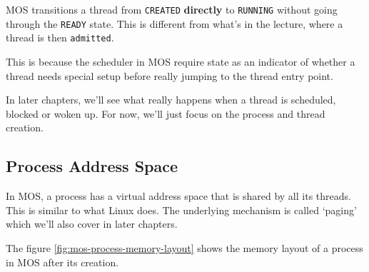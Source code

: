 \begin{note}
    \item MOS transitions a thread from \texttt{CREATED} \textbf{directly} to
    \texttt{RUNNING} without going through the \texttt{READY} state. This is different
    from what's in the lecture, where a thread is then \texttt{admitted}.

    This is because the scheduler in MOS require state as an indicator of whether a thread
    needs special setup before really jumping to the thread entry point.
\end{note}

In later chapters, we'll see what really happens when a thread is scheduled, blocked
or woken up. For now, we'll just focus on the process and thread creation.

\subsection{Process Address Space}

In MOS, a process has a virtual address space that is shared by all its threads. This is
similar to what Linux does. The underlying mechanism is called `paging' which we'll
also cover in later chapters.

The figure \ref{fig:mos-process-memory-layout} shows the memory layout of a process in MOS
after its creation.

